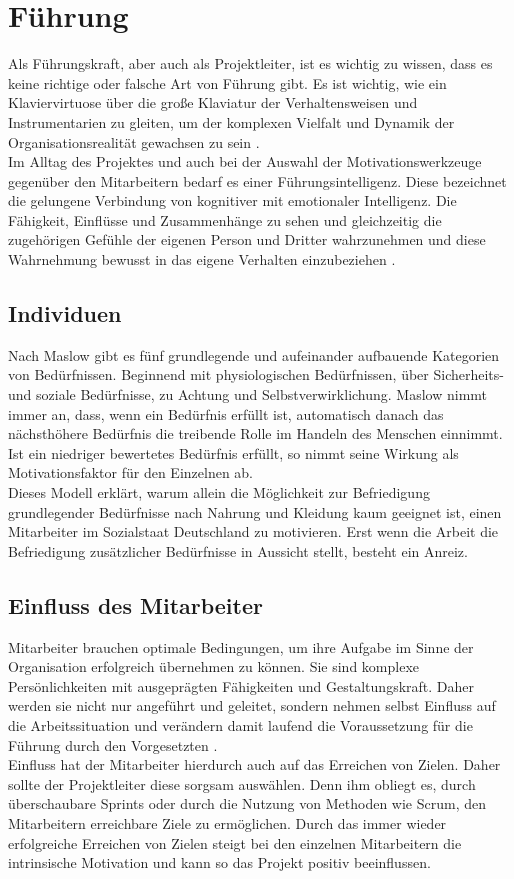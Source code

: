 \documentclass[12pt,a4paper]{scrreprt}
\begin{document}
\section{Führung}
Als Führungskraft, aber auch als Projektleiter, ist es wichtig zu wissen, dass es keine richtige oder falsche Art von Führung gibt. Es ist wichtig, wie ein Klaviervirtuose über die große Klaviatur der Verhaltensweisen und Instrumentarien zu gleiten, um der komplexen Vielfalt und Dynamik der Organisationsrealität gewachsen zu sein \cite{Lippmann2013}. \\
Im Alltag des Projektes und auch bei der Auswahl der Motivationswerkzeuge gegenüber den Mitarbeitern bedarf es einer Führungsintelligenz. Diese bezeichnet die gelungene Verbindung  von kognitiver mit emotionaler Intelligenz. Die Fähigkeit, Einflüsse und Zusammenhänge zu sehen und gleichzeitig die zugehörigen Gefühle der eigenen Person und Dritter wahrzunehmen und diese Wahrnehmung bewusst in das eigene Verhalten einzubeziehen \cite{Lippmann2013}.

\subsection{Individuen}
Nach Maslow gibt es fünf grundlegende und aufeinander aufbauende Kategorien von Bedürfnissen. Beginnend mit physiologischen Bedürfnissen, über Sicherheits- und soziale Bedürfnisse, zu Achtung und Selbstverwirklichung. Maslow nimmt immer an, dass, wenn ein Bedürfnis erfüllt ist, automatisch danach das nächsthöhere Bedürfnis die treibende Rolle im Handeln des Menschen einnimmt. Ist ein niedriger bewertetes Bedürfnis erfüllt, so nimmt seine Wirkung als Motivationsfaktor für den Einzelnen ab.\\
Dieses Modell erklärt, warum allein die Möglichkeit zur Befriedigung grundlegender Bedürfnisse nach Nahrung und Kleidung kaum geeignet ist, einen Mitarbeiter im Sozialstaat Deutschland zu motivieren. Erst wenn die Arbeit die Befriedigung zusätzlicher Bedürfnisse in Aussicht stellt, besteht ein Anreiz. 

\subsection{Einfluss des Mitarbeiter}
Mitarbeiter brauchen optimale Bedingungen, um ihre Aufgabe im Sinne der Organisation erfolgreich übernehmen zu können. Sie sind komplexe Persönlichkeiten mit ausgeprägten Fähigkeiten und Gestaltungskraft. Daher werden sie nicht nur angeführt und geleitet, sondern nehmen selbst Einfluss auf die Arbeitssituation und verändern damit laufend die Voraussetzung für die Führung durch den Vorgesetzten \cite{Lippmann2013}. \\
Einfluss hat der Mitarbeiter hierdurch auch auf das Erreichen von Zielen. Daher sollte der Projektleiter diese sorgsam auswählen. Denn ihm obliegt es, durch überschaubare Sprints oder durch die Nutzung von Methoden wie Scrum, den Mitarbeitern erreichbare Ziele zu ermöglichen. Durch das immer wieder erfolgreiche Erreichen von Zielen steigt bei den einzelnen Mitarbeitern die intrinsische Motivation und kann so das Projekt positiv beeinflussen. 
\end{document}
